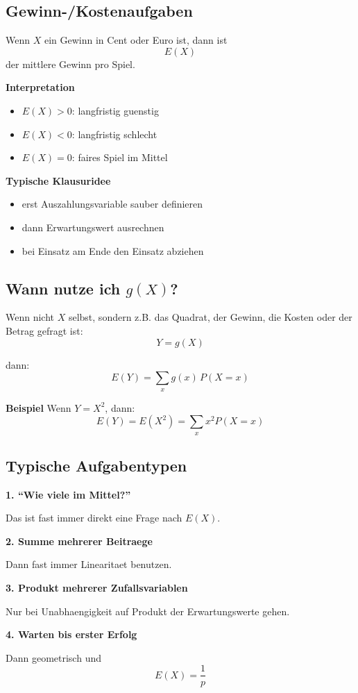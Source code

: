 \documentclass[a4paper,11pt]{article}
\begin{document}
\subsection{Gewinn-/Kostenaufgaben}
Wenn $X$ ein Gewinn in Cent oder Euro ist, dann ist
\[
E(X)
\]
der mittlere Gewinn pro Spiel.

\textbf{Interpretation}
\begin{itemize}
  \item $E(X)>0$: langfristig guenstig
  \item $E(X)<0$: langfristig schlecht
  \item $E(X)=0$: faires Spiel im Mittel
\end{itemize}

\textbf{Typische Klausuridee}
\begin{itemize}
  \item erst Auszahlungsvariable sauber definieren
  \item dann Erwartungswert ausrechnen
  \item bei Einsatz am Ende den Einsatz abziehen
\end{itemize}

\subsection{Wann nutze ich $g(X)$?}
Wenn nicht $X$ selbst, sondern z.B. das Quadrat, der Gewinn, die Kosten oder der Betrag gefragt ist:
\[
Y=g(X)
\]

dann:
\[
E(Y)=\sum_x g(x)\,P(X=x)
\]

\textbf{Beispiel}
Wenn $Y=X^2$, dann:
\[
E(Y)=E(X^2)=\sum_x x^2 P(X=x)
\]

\subsection{Typische Aufgabentypen}
\textbf{1. ``Wie viele im Mittel?''}

Das ist fast immer direkt eine Frage nach $E(X)$.

\textbf{2. Summe mehrerer Beitraege}

Dann fast immer Linearitaet benutzen.

\textbf{3. Produkt mehrerer Zufallsvariablen}

Nur bei Unabhaengigkeit auf Produkt der Erwartungswerte gehen.

\textbf{4. Warten bis erster Erfolg}

Dann geometrisch und
\[
E(X)=\frac1p
\]
\end{document}
